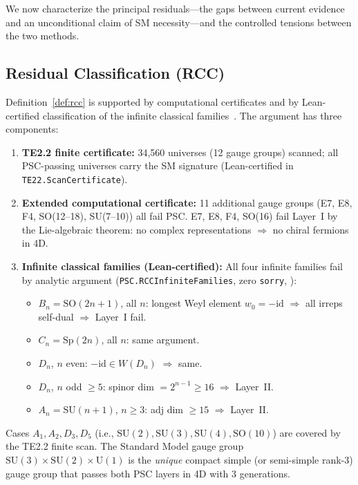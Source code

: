 \documentclass[11pt,twocolumn]{article}
\theoremstyle{remark}
\begin{document}
We now characterize the principal residuals—the gaps between current
evidence and an unconditional claim of SM necessity—and the controlled
tensions between the two methods.

\subsection{Residual Classification (RCC)}
\label{sec:rcc}

Definition~\ref{def:rcc} is supported by computational certificates and by
Lean-certified classification of the infinite classical families~\cite{ugp-lean}.
The argument has three components:
\begin{enumerate}
  \item \textbf{TE2.2 finite certificate:} 34,560 universes (12 gauge groups) scanned;
    all PSC-passing universes carry the SM signature (Lean-certified in
    \texttt{TE22.ScanCertificate}).

  \item \textbf{Extended computational certificate:} 11 additional gauge groups
    (E7, E8, F4, SO(12--18), SU(7--10)) all fail PSC.
    E7, E8, F4, SO(16) fail Layer~I by the Lie-algebraic theorem:
    no complex representations $\Rightarrow$ no chiral fermions in 4D.

  \item \textbf{Infinite classical families (Lean-certified):}
    All four infinite families fail by analytic argument
    (\texttt{PSC.RCCInfiniteFamilies}, zero \texttt{sorry},
    \cite{ugp-lean}):
    \begin{itemize}
      \item $B_n = \mathrm{SO}(2n{+}1)$, all $n$: longest Weyl element $w_0 = -\mathrm{id}$
        $\Rightarrow$ all irreps self-dual $\Rightarrow$ Layer~I fail.
      \item $C_n = \mathrm{Sp}(2n)$, all $n$: same argument.
      \item $D_n$, $n$ even: $-\mathrm{id} \in W(D_n)$ $\Rightarrow$ same.
      \item $D_n$, $n$ odd $\ge 5$: spinor dim $= 2^{n-1} \ge 16$ $\Rightarrow$ Layer~II.
      \item $A_n = \mathrm{SU}(n{+}1)$, $n \ge 3$: adj dim $\ge 15$ $\Rightarrow$ Layer~II.
    \end{itemize}
\end{enumerate}

Cases $A_1, A_2, D_3, D_5$ (i.e., $\mathrm{SU}(2), \mathrm{SU}(3), \mathrm{SU}(4),
\mathrm{SO}(10)$) are covered by the TE2.2 finite scan.
The Standard Model gauge group $\mathrm{SU}(3){\times}\mathrm{SU}(2){\times}\mathrm{U}(1)$
is the \emph{unique} compact simple (or semi-simple rank-3) gauge group that passes
both PSC layers in 4D with 3 generations.
\end{document}
